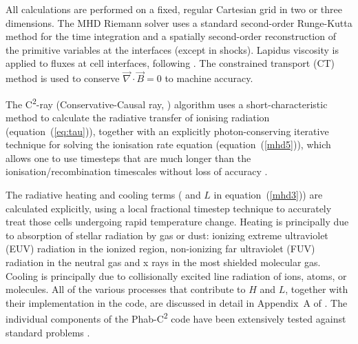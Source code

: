 All calculations are performed on a fixed, regular Cartesian grid in two or three dimensions. The MHD Riemann solver uses a standard second-order Runge-Kutta method for the time integration and a spatially second-order reconstruction of the primitive variables at the interfaces (except in shocks). Lapidus viscosity is applied to fluxes at cell interfaces, following \citet{1984JCoPh..54..174C}. The constrained transport (CT) method \citep[e.g.,][]{2000JCoPh.161..605T} is used to conserve \(\vec{\nabla} \cdot \vec{B} = 0\) to machine accuracy. 

The C\textsuperscript{2}-ray (Conservative-Causal ray, \citealp{2006NewA...11..374M}) algorithm uses a short-characteristic method to calculate the radiative transfer of ionising radiation (equation~(\ref{eq:tau})), together with an explicitly photon-conserving iterative technique for solving the ionisation rate equation (equation~(\ref{mhd5})), which allows one to use timesteps that are much longer than the ionisation/recombination timescales without loss of accuracy \citep{2006MNRAS.371.1057I}. 

The radiative heating and cooling terms ( and \(L\) in equation~(\ref{mhd3})) are calculated explicitly, using a local fractional timestep technique to accurately treat those cells undergoing rapid temperature change. Heating is principally due to absorption of stellar radiation by gas or dust: ionizing extreme ultraviolet (EUV) radiation in the ionized region, non-ionizing far ultraviolet (FUV) radiation in the neutral gas and x rays in the most shielded molecular gas. Cooling is principally due to collisionally excited line radiation of ions, atoms, or molecules. All of the various processes that contribute to \(H\) and \(L\), together with their implementation in the code, are discussed in detail in Appendix~A of \citet{Henney:2009}. The individual components of the Phab-C\textsuperscript{2} code have been extensively tested against standard problems \citep{De-Colle:2005, 2004Ap&SS.293..173D, 2006MNRAS.371.1057I}. 

